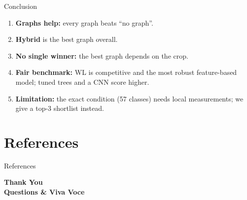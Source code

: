 \documentclass[aspectratio=169, 11pt]{beamer}
\begin{document}
\begin{frame}{Conclusion}
    \small
    \begin{enumerate}
        \setlength{\itemsep}{0.35cm}
        \item \textbf{Graphs help:} every graph beats ``no graph''.
        \item \textbf{Hybrid} is the best graph overall.
        \item \textbf{No single winner:} the best graph depends on the crop.
        \item \textbf{Fair benchmark:} WL is competitive and the most robust feature-based model; tuned trees and a CNN score higher.
        \item \textbf{Limitation:} the exact condition (57 classes) needs local measurements; we give a top-3 shortlist instead.
    \end{enumerate}
    \vspace{0.3cm}
    \begin{center}
    \end{center}
\end{frame}

\section{References}
\begin{frame}[allowframebreaks]{References}
    \tiny
    
    
\end{frame}

\begin{frame}
    \centering
    {\Huge \textbf{\textcolor{amritaMaroon}{Thank You}}} \\[0.4cm]
    {\large \textbf{Questions \& Viva Voce}}
\end{frame}
\end{document}
